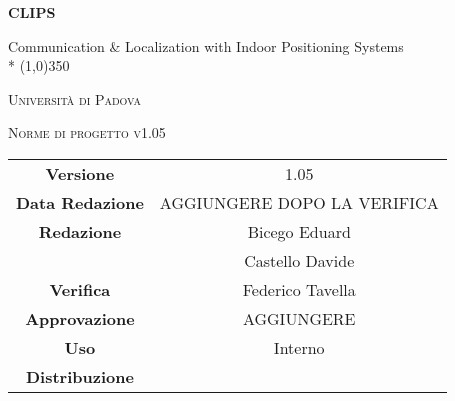 \documentclass[a4paper,12pt]{article}
\author{Conti Oscar Elia, Zanella Marco}
\date{18/02/2016}
\begin{document}
\begin{titlepage}
	\centering
	{\huge\bfseries CLIPS\par}
	Communication \& Localization with Indoor Positioning Systems \\*
	\line(1,0){350} \\
	{\scshape\LARGE Università di Padova \par}
	\vspace{1cm}
	{\scshape\Large Norme di progetto v1.05 \par}
	\logo
	\newpage
		\begin{tabular}{c|c}
			{\hfill \textbf{Versione}} 			& 1.05			\\
			{\hfill\textbf{Data Redazione}} 		& AGGIUNGERE DOPO LA VERIFICA \\ 
			{\hfill\textbf{Redazione}} 			&  Bicego Eduard \\ 
											&  Castello Davide       \\
			{\hfill\textbf{Verifica}} 				&  Federico Tavella   \\
			{\hfill\textbf{Approvazione}} 		&  AGGIUNGERE \\
			{\hfill\textbf{Uso}} 					& Interno			\\
			{\hfill\textbf{Distribuzione}} 			& \leaf			\\
		\end{tabular}
	\end{titlepage}
	\newpage
	\pagestyle{myfront}
	
		\newpage
			\tableofcontents
		\newpage
			\listoffigures	
	\label{LastFrontPage}
	\newpage
	\pagestyle{mymain}
         
    \newpage
		

	\newpage
		
	
	\newpage
		
	
	\newpage
		
		
	\label{LastPage}
\end{document}
